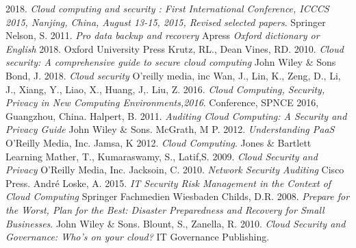\documentclass{article}
\begin{document}
\begin{desctiption}
\begin{thebibliography}{9}
        2018.
	\textit{Cloud computing and security : First International Conference, ICCCS 2015, Nanjing, China, August 13-15, 2015, Revised selected papers}.
	Springer
        Nelson, S.
        2011.
        \textit{Pro data backup and recovery}
	Apress
	\textit{Oxford dictionary or English}
	2018.
	Oxford University Press
        Krutz, RL.,
        Dean Vines, RD.
        2010.
        \textit{Cloud security: A comprehensive guide to secure cloud computing}
	John Wiley \& Sons
        Bond, J.
        2018.
        \textit{Cloud security}
	O'reilly media, inc
        Wan, J.,
        Lin, K.,
        Zeng, D.,
        Li, J.,
        Xiang, Y.,
        Liao, X.,
        Huang, J,.
        Liu, Z.
        2016.
        \textit{Cloud Computing, Security, Privacy in New Computing Environments,2016}.
	Conference, SPNCE 2016, Guangzhou, China.
        Halpert, B.
        2011.
	\textit{Auditing Cloud Computing: A Security and Privacy Guide}
	John Wiley \& Sons.
        McGrath, M P.
        2012.
	\textit{Understanding PaaS}
        O'Reilly Media, Inc.
        Jamsa, K
        2012.
        \textit{Cloud Computing}.
	Jones \& Bartlett Learning
        Mather, T.,
        Kumaraswamy, S.,
        Latif,S.
        2009.
	\textit{Cloud Security and Privacy}
        O'Reilly Media, Inc.
        Jacksoin, C.
        2010.
       	\textit{Network Security Auditing}
	Cisco Press.
        André Loske, A.
        2015.
	\textit{IT Security Risk Management in the Context of Cloud Computing}
        Springer Fachmedien Wiesbaden
        Childs, D.R.
        2008.
        \textit{Prepare for the Worst, Plan for the Best: Disaster Preparedness and Recovery for Small Businesses}.
	John Wiley \& Sons.
        Blount, S.,
	Zanella, R.
        2010.
	\textit{Cloud Security and Governance: Who's on your cloud?}
        IT Governance Publishing.

\end{thebibliography}
\end{desctiption}
\end{document}

